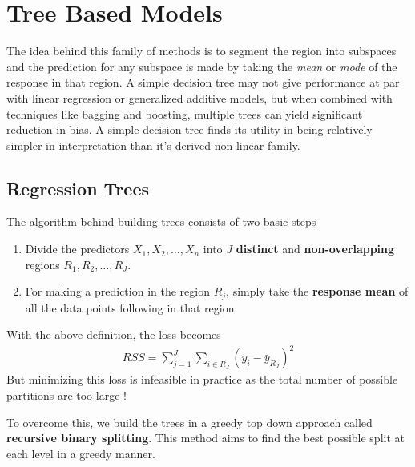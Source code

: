 \documentclass[../statistical_learning_notes.tex]{subfiles}
\begin{document}
    \chapter{Tree Based Models}
    The idea behind this family of methods is to segment the region into subspaces and the prediction for any subspace is made by taking the \emph{mean} or \emph{mode} of the response in that region.\newline
    A simple decision tree may not give performance at par with linear regression or generalized additive models, but when combined with techniques like bagging and boosting, multiple trees can yield significant reduction in bias.\newline
    A simple decision tree finds its utility in being relatively simpler in interpretation than it's derived non-linear family.

    \section{Regression Trees}
    The algorithm behind building trees consists of two basic steps
    \begin{enumerate}
        \item Divide the predictors $X_{1}, X_{2}, \ldots, X_{n}$ into $J$ \textbf{distinct} and \textbf{non-overlapping} regions $R_{1}, R_{2}, \ldots, R_{J}$.
        \item For making a prediction in the region $R_{j}$, simply take the \textbf{response mean} of all the data points following in that region.
    \end{enumerate}
    With the above definition, the loss becomes
    \begin{align*}
        RSS = \sum_{j=1}^{J} \sum_{i \in R_{J}} (y_{i} - \bar{y}_{R_{J}})^{2}
    \end{align*}
    But minimizing this loss is infeasible in practice as the total number of possible partitions are too large !\newline

    To overcome this, we build the trees in a greedy top down approach called \textbf{recursive binary splitting}. This method aims to find the best possible split at each level in a greedy manner.\newline

\end{document}
